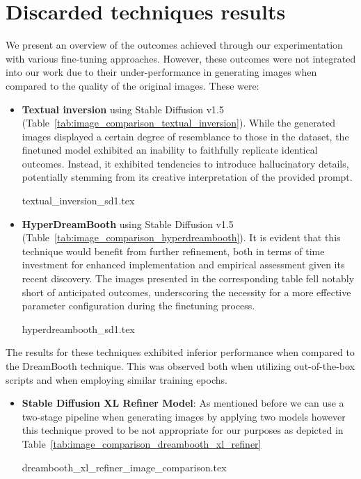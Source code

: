 \section{Discarded techniques results}
\label{sec:discarded_techniques}

We present an overview of the outcomes achieved through our experimentation with various fine-tuning approaches. However, these outcomes were not integrated into our work due to their under-performance in generating images when compared to the quality of the original images. These were:
\begin{itemize}
    \item \textbf{Textual inversion} using Stable Diffusion v1.5 (Table~\ref{tab:image_comparison_textual_inversion}). While the generated images displayed a certain degree of resemblance to those in the dataset, the finetuned model exhibited an inability to faithfully replicate identical outcomes. Instead, it exhibited tendencies to introduce hallucinatory details, potentially stemming from its creative interpretation of the provided prompt.

{textual_inversion_sd1.tex}

    \item \textbf{HyperDreamBooth} using Stable Diffusion v1.5 (Table~\ref{tab:image_comparison_hyperdreambooth}). It is evident that this technique would benefit from further refinement, both in terms of time investment for enhanced implementation and empirical assessment given its recent discovery. The images presented in the corresponding table fell notably short of anticipated outcomes, underscoring the necessity for a more effective parameter configuration during the finetuning process.

{hyperdreambooth_sd1.tex}
\end{itemize}

The results for these techniques exhibited inferior performance when compared to the DreamBooth technique. This was observed both when utilizing out-of-the-box scripts and when employing similar training epochs.

\begin{itemize}
    \item \textbf{Stable Diffusion XL Refiner Model}: As mentioned before we can use a two-stage pipeline when generating images by applying two models however this technique proved to be not appropriate for our purposes as depicted in Table~\ref{tab:image_comparison_dreambooth_xl_refiner}
    
{dreambooth_xl_refiner_image_comparison.tex}
\end{itemize}
